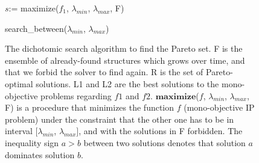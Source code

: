\documentclass{bioinfo}
\begin{document}
\begin{methods}
\begin{figure}[!tbp]
\begin{algorithm}[H]
$s$:= maximize($f_1$, $\lambda_{min}$, $\lambda_{max}$, F)\;
\caption{search\_between($\lambda_{min}$, $\lambda_{max}$)}
\end{algorithm}

\caption{The dichotomic search algorithm to find the Pareto set. F is the ensemble of already-found structures which grows over time, and that we forbid the solver to find again. R is the set of Pareto-optimal solutions. L1 and L2 are the best solutions to the mono-objective problems regarding $f1$ and $f2$. $\mathbf{maximize}$($f$, $\lambda_{min}$, $\lambda_{max}$, F) is a procedure that minimizes the function $f$ (mono-objective IP problem) under the constraint that the other one has to be in interval $[\lambda_{min}$, $\lambda_{max}]$, and with the solutions in F forbidden. The inequality sign $a>b$ between two solutions denotes that solution $a$ dominates solution $b$.}\label{fig:findP}
\end{figure}

\end{methods}

\end{document}
